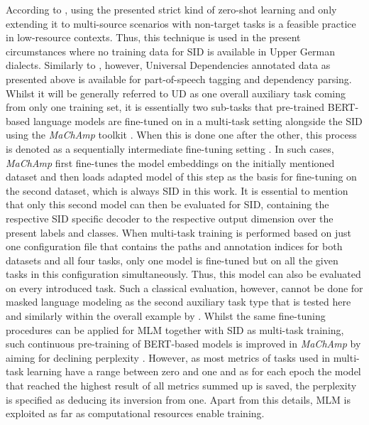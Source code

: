 \documentclass[11pt,a4paper,twoside,openright]{scrbook}
\begin{document}
According to \citet{Zampieri_Nakov_Scherrer_2020}, using the presented strict kind of zero-shot learning and only extending it to multi-source scenarios with non-target tasks is a feasible practice in low-resource contexts. Thus, this technique is used in the present circumstances where no training data for SID is available in Upper German dialects. Similarly to \citet{van-der-goot-etal-2021-masked}, however, Universal Dependencies annotated data as presented above is available for part-of-speech tagging and dependency parsing. Whilst it will be generally referred to UD as one overall auxiliary task coming from only one training set, it is essentially two sub-tasks that pre-trained BERT-based language models are fine-tuned on in a multi-task setting alongside the SID using the \textit{MaChAmp} toolkit \citet{van-der-goot-etal-2021-massive}. When this is done one after the other, this process is denoted as a sequentially intermediate fine-tuning setting \citep{pruksachatkun-etal-2020-intermediate, phang-etal-2020-english}. In such cases, \textit{MaChAmp} first fine-tunes the model embeddings on the initially mentioned dataset and then loads adapted model of this step as the basis for fine-tuning on the second dataset, which is always SID in this work. It is essential to mention that only this second model can then be evaluated for SID, containing the respective SID specific decoder to the respective output dimension over the present labels and classes. When multi-task training is performed based on just one configuration file that contains the paths and annotation indices for both datasets and all four tasks, only one model is fine-tuned but on all the given tasks in this configuration simultaneously. Thus, this model can also be evaluated on every introduced task. Such a classical evaluation, however, cannot be done for masked language modeling as the second auxiliary task type that is tested here and similarly within the overall example by \citet{van-der-goot-etal-2021-masked}. Whilst the same fine-tuning procedures can be applied for MLM together with SID as multi-task training, such continuous pre-training of BERT-based models is improved in \textit{MaChAmp} by aiming for declining perplexity \citep{van-der-goot-etal-2021-massive}. However, as most metrics of tasks used in multi-task learning have a range between zero and one and as for each epoch the model that reached the highest result of all metrics summed up is saved, the perplexity is specified as deducing its inversion from one. Apart from this details, MLM is exploited as far as computational resources enable training.
\end{document}
